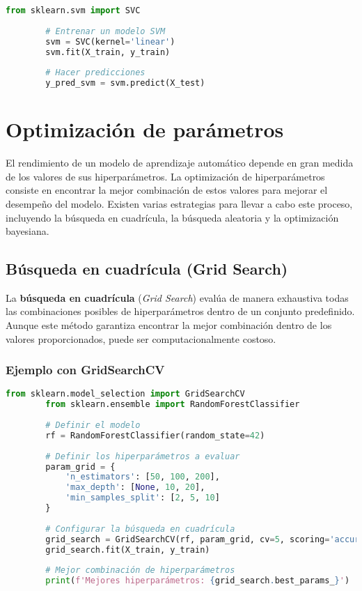 \documentclass{book}
\begin{document}
	\begin{lstlisting}[language=Python, caption=Ejemplo de modelo SVM]
		from sklearn.svm import SVC
		
		# Entrenar un modelo SVM
		svm = SVC(kernel='linear')
		svm.fit(X_train, y_train)
		
		# Hacer predicciones
		y_pred_svm = svm.predict(X_test)
	\end{lstlisting}
	
	\section{Optimización de parámetros}
	
	El rendimiento de un modelo de aprendizaje automático depende en gran medida de los valores de sus hiperparámetros. La optimización de hiperparámetros consiste en encontrar la mejor combinación de estos valores para mejorar el desempeño del modelo. Existen varias estrategias para llevar a cabo este proceso, incluyendo la búsqueda en cuadrícula, la búsqueda aleatoria y la optimización bayesiana.
	
	\subsection{Búsqueda en cuadrícula (Grid Search)}
	
	La \textbf{búsqueda en cuadrícula} (\textit{Grid Search}) evalúa de manera exhaustiva todas las combinaciones posibles de hiperparámetros dentro de un conjunto predefinido. Aunque este método garantiza encontrar la mejor combinación dentro de los valores proporcionados, puede ser computacionalmente costoso.
	
	\subsubsection{Ejemplo con GridSearchCV}
	
	\begin{lstlisting}[language=Python, caption=Optimización de hiperparámetros con Grid Search]
		from sklearn.model_selection import GridSearchCV
		from sklearn.ensemble import RandomForestClassifier
		
		# Definir el modelo
		rf = RandomForestClassifier(random_state=42)
		
		# Definir los hiperparámetros a evaluar
		param_grid = {
			'n_estimators': [50, 100, 200],
			'max_depth': [None, 10, 20],
			'min_samples_split': [2, 5, 10]
		}
		
		# Configurar la búsqueda en cuadrícula
		grid_search = GridSearchCV(rf, param_grid, cv=5, scoring='accuracy', n_jobs=-1)
		grid_search.fit(X_train, y_train)
		
		# Mejor combinación de hiperparámetros
		print(f'Mejores hiperparámetros: {grid_search.best_params_}')
	\end{lstlisting}
	
\end{document}
